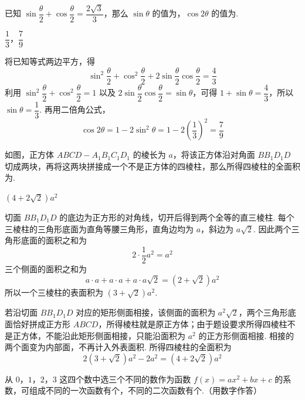 \begin{problem}
已知 \(\sin\dfrac{\theta}{2}+\cos\dfrac{\theta}{2}=\dfrac{2\sqrt{3}}{3}\)，那么 \(\sin\theta\) 的值为\fillinblank{}，\(\cos2\theta\) 的值为\fillinblank{}.
\end{problem}

\begin{answer}
\(\dfrac13\)，\(\dfrac79\)
\end{answer}

\begin{solution}
将已知等式两边平方，得
\[
\sin^2\frac\theta2+\cos^2\frac\theta2+2\sin\frac\theta2\cos\frac\theta2=\frac43
\]
利用 \(\sin^2\dfrac\theta2+\cos^2\dfrac\theta2=1\) 以及 \(2\sin\dfrac\theta2\cos\dfrac\theta2=\sin\theta\)，可得 \(1+\sin\theta=\dfrac43\)，所以 \(\sin\theta=\dfrac13\). 再用二倍角公式，
\[
\cos2\theta=1-2\sin^2\theta=1-2\left(\frac13\right)^2=\frac79
\]
\end{solution}

\begin{problem}
如图，正方体 \(ABCD-A_1B_1C_1D_1\) 的棱长为 \(a\)，将该正方体沿对角面 \(BB_1D_1D\) 切成两块，再将这两块拼接成一个不是正方体的四棱柱，那么所得四棱柱的全面积为\fillinblank{}.

\end{problem}

\begin{answer}
\((4+2\sqrt{2})a^2\)
\end{answer}

\begin{solution}
切面 \(BB_1D_1D\) 的底边为正方形的对角线，切开后得到两个全等的直三棱柱. 每个三棱柱的三角形底面为直角等腰三角形，直角边均为 \(a\)，斜边为 \(a\sqrt2\). 因此两个三角形底面的面积之和为
\[
2\cdot\frac12a^2=a^2
\]
三个侧面的面积之和为
\[
a\cdot a+a\cdot a+a\cdot a\sqrt2=(2+\sqrt2)a^2
\]
所以一个三棱柱的表面积为 \((3+\sqrt2)a^2\).

若沿切面 \(BB_1D_1D\) 对应的矩形侧面相接，该侧面的面积为 \(a^2\sqrt2\)，两个三角形底面恰好拼成正方形 \(ABCD\)，所得棱柱就是原正方体；由于题设要求所得四棱柱不是正方体，不能沿此矩形侧面相接，只能沿面积为 \(a^2\) 的正方形侧面相接. 相接的两个面变为内部面，不再计入外表面积. 所得四棱柱的全面积为
\[
2(3+\sqrt2)a^2-2a^2=(4+2\sqrt2)a^2
\]
\end{solution}

\begin{problem}
从 \(0\)，\(1\)，\(2\)，\(3\) 这四个数中选三个不同的数作为函数 \(f(x)=ax^2+bx+c\) 的系数，可组成不同的一次函数有\fillinblank{}个，不同的二次函数有\fillinblank{}个.（用数字作答）
\end{problem}

